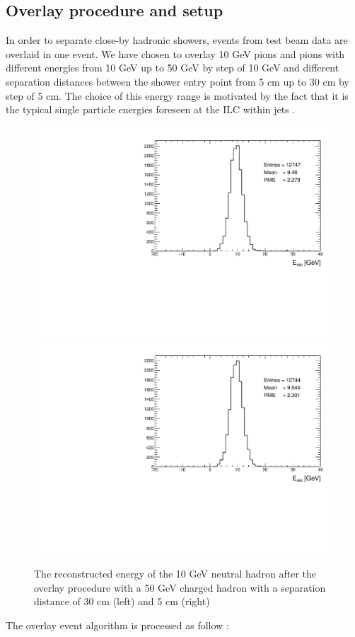 \documentclass[cits]{JINST}
\begin{document}
\subsection{Overlay procedure and setup}

In order to separate close-by hadronic showers, events from test beam data are overlaid in one event. We have chosen to overlay 10 GeV pions and pions with different energies from 10 GeV up to 50 GeV by step of 10 GeV and different separation distances between the shower entry point from 5 cm up to 30 cm by step of 5 cm. The choice of this energy range is motivated by the fact that it is the typical single particle energies foreseen at the ILC within jets \cite{ilc-tdr}. 

\begin{figure}[!h]
  \begin{center}
    \includegraphics[width=0.47\linewidth]{plots/histo_neutral_mcenergy_ArborPFA_TestBeam_10GeV_n_50GeV_ch_30_cm.pdf}
    \includegraphics[width=0.47\linewidth]{plots/histo_neutral_mcenergy_ArborPFA_TestBeam_10GeV_n_50GeV_ch_5_cm.pdf}
  \end{center}
  \caption{\label{OVERLAY_EVENT_MC_EREC_OVERLAID_HITS} The reconstructed energy of the 10 GeV neutral hadron after the overlay procedure with a 50 GeV charged hadron with a separation distance of 30 cm (left) and 5 cm (right)}
\end{figure}

The overlay event algorithm is processed as follow :
\end{document}
